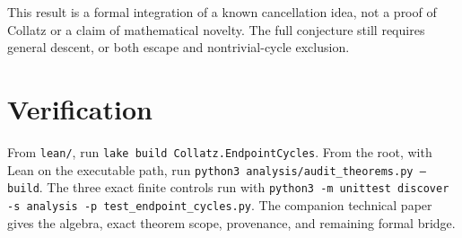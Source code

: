 \documentclass[10pt]{article}
\begin{document}
This result is a formal integration of a known cancellation idea, not a
proof of Collatz or a claim of mathematical novelty. The full conjecture
still requires general descent, or both escape and nontrivial-cycle exclusion.

\section*{Verification}
From \texttt{lean/}, run \texttt{lake build Collatz.EndpointCycles}.
From the root, with Lean on the executable path, run
\texttt{python3 analysis/audit\_theorems.py --build}.
The three exact finite controls run with
\texttt{python3 -m unittest discover -s analysis -p test\_endpoint\_cycles.py}.
The companion technical paper gives the algebra, exact theorem scope,
provenance, and remaining formal bridge.
\end{document}

